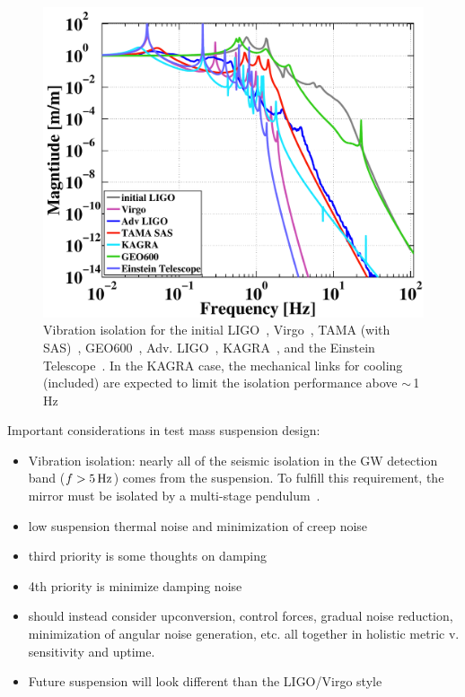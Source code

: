 \begin{figure}[h]
\centering
\includegraphics[width=\columnwidth]{Figures/SeismicIsolations.pdf}
\caption{Vibration isolation for the initial LIGO~\cite{ponslet:432, Giaime:1996},
                   Virgo~\cite{Stefano:2001, Virgo:SA2010, Accadia:2011jh},
                   TAMA (with SAS)~\cite{Szabi:TAMASAS},
                   GEO600~\cite{Hartmut:PhD, Ken:GEOseismic, plissi:3055},
                   Adv. LIGO~\cite{aLIGO:Seismic2002},
                    KAGRA~\cite{Somiya:2011tb}, and the Einstein Telescope~\cite{ET2011}. In the KAGRA case,
                    the mechanical links for cooling (included) are expected to limit the
                    isolation performance above $\sim$\,1\,Hz~\cite{Takahashi:email}}
\label{fig:SeismicTFs}
\end{figure}


Important considerations in test mass suspension design\cite{SUS:2012, Aston:2012}:
\begin{itemize}
   \item Vibration isolation: nearly all of the seismic isolation in the GW detection band ($f > 5\,\rm Hz$)
     comes from the suspension. To fulfill this requirement, the mirror must be isolated by a
     multi-stage pendulum~\cite{Beker:2011}.
    \item low suspension thermal noise and minimization of creep noise~\cite{Levin:2012ek, Gretarsson:2005gs}
    \item third priority is some thoughts on damping
    \item 4th priority is minimize damping noise
    \item should instead consider upconversion, control forces, gradual noise reduction, minimization of angular noise generation, etc. all together in holistic metric v. sensitivity and uptime.
    \item Future suspension will look different than the LIGO/Virgo style
\end{itemize}


